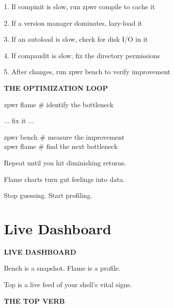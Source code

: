 \documentclass[11pt,a4paper,twoside]{book}
\begin{document}
\begin{codebox}
1. If compinit is slow, run zpwr compile to cache it\\
\end{codebox}

2. If a version manager dominates, lazy-load it

3. If an autoload is slow, check for disk I/O in it

4. If compaudit is slow, fix the directory permissions

\begin{codebox}
5. After changes, run zpwr bench to verify improvement\\
\end{codebox}


\vspace{12pt}
{\bfseries\color{neonyellow} THE OPTIMIZATION LOOP}\vspace{4pt}

\begin{codebox}
zpwr flame      \# identify the bottleneck\\
\end{codebox}

... fix it ...

\begin{codebox}
zpwr bench      \# measure the improvement\\
zpwr flame      \# find the next bottleneck\\
\end{codebox}

Repeat until you hit diminishing returns.

Flame charts turn gut feelings into data.

Stop guessing. Start profiling.


\vspace{16pt}

\section{Live Dashboard}


\vspace{10pt}
{\large\bfseries\color{neoncyan} LIVE DASHBOARD}\vspace{6pt}

Bench is a snapshot. Flame is a profile.

Top is a live feed of your shell's vital signs.


\vspace{12pt}
{\bfseries\color{neonyellow} THE TOP VERB}\vspace{4pt}
\end{document}

